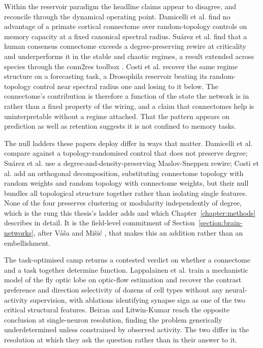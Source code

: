 Within the reservoir paradigm the headline claims appear to disagree, and reconcile through
the dynamical operating point. Damicelli et al. \cite{damicelli2022brain} find no advantage
of a primate cortical connectome over random-topology controls on memory capacity at a
fixed canonical spectral radius. Suárez et al. \cite{suarez2021learning} find that a human
consensus connectome exceeds a degree-preserving rewire at criticality and underperforms it
in the stable and chaotic regimes, a result extended across species through the conn2res
toolbox \cite{suarez2024connectome}. Costi et al. \cite{costi2025drosophila} recover the
same regime structure on a forecasting task, a Drosophila reservoir beating its
random-topology control near spectral radius one and losing to it below. The connectome's
contribution is therefore a function of the state the network is in rather than a fixed
property of the wiring, and a claim that connectomes help is uninterpretable without a
regime attached. That the pattern appears on prediction as well as retention suggests it is
not confined to memory tasks.
 
The null ladders these papers deploy differ in ways that matter. Damicelli et al.
\cite{damicelli2022brain} compare against a topology-randomised control that does not
preserve degree; Suárez et al. \cite{suarez2021learning, suarez2024connectome} use a
degree-and-density-preserving Maslov-Sneppen rewire; Costi et al.
\cite{costi2025drosophila} add an orthogonal decomposition, substituting connectome
topology with random weights and random topology with connectome weights, but their null
bundles all topological structure together rather than isolating single features. None of
the four preserves clustering or modularity independently of degree, which is the rung this
thesis's ladder adds and which Chapter~\ref{chapter:methods} describes in detail. It is the
field-level commitment of Section~\ref{section:brain-networks}, after Váša and Mišić
\cite{vavsa2022null}, that makes this an addition rather than an embellishment.
 
The task-optimised camp returns a contested verdict on whether a connectome and a task
together determine function. Lappalainen et al. \cite{lappalainen2024connectome} train a
mechanistic model of the fly optic lobe on optic-flow estimation and recover the contrast
preference and direction selectivity of dozens of cell types without any neural-activity
supervision, with ablations identifying synapse sign as one of the two critical structural
features. Beiran and Litwin-Kumar \cite{beiran2025prediction} reach the opposite conclusion
at single-neuron resolution, finding the problem generically underdetermined unless
constrained by observed activity. The two differ in the resolution at which they ask the
question rather than in their answer to it.
 
